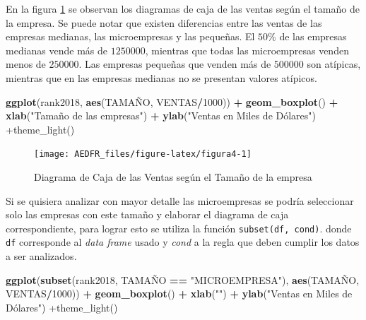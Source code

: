 \documentclass[letterpaper,]{book}
\newenvironment{Shaded}{\begin{snugshade}}{\end{snugshade}}
\newcommand{\DecValTok}[1]{\textcolor[rgb]{0.00,0.00,0.81}{#1}}
\newcommand{\KeywordTok}[1]{\textcolor[rgb]{0.13,0.29,0.53}{\textbf{#1}}}
\newcommand{\NormalTok}[1]{#1}
\newcommand{\OperatorTok}[1]{\textcolor[rgb]{0.81,0.36,0.00}{\textbf{#1}}}
\newcommand{\StringTok}[1]{\textcolor[rgb]{0.31,0.60,0.02}{#1}}
\begin{document}
En la figura \ref{fig:figura4} se observan los diagramas de caja de las ventas según el tamaño de la empresa. Se puede notar que existen diferencias entre las ventas de las empresas medianas, las microempresas y las pequeñas. El \(50\%\) de las empresas medianas vende más de \(1250000\), mientras que todas las microempresas venden menos de \(250000\). Las empresas pequeñas que venden más de \(500000\) son atípicas, mientras que en las empresas medianas no se presentan valores atípicos.

\begin{Shaded}
\begin{Highlighting}[]
\KeywordTok{ggplot}\NormalTok{(rank2018, }\KeywordTok{aes}\NormalTok{(TAMAÑO, VENTAS}\OperatorTok{/}\DecValTok{1000}\NormalTok{)) }\OperatorTok{+}\StringTok{ }
\StringTok{  }\KeywordTok{geom_boxplot}\NormalTok{() }\OperatorTok{+}\StringTok{ }\KeywordTok{xlab}\NormalTok{(}\StringTok{"Tamaño de las empresas"}\NormalTok{) }\OperatorTok{+}
\StringTok{  }\KeywordTok{ylab}\NormalTok{(}\StringTok{"Ventas en Miles de Dólares") +theme_light()}
\end{Highlighting}
\end{Shaded}

\begin{figure}[h!]

{\centering \texttt{[image: AEDFR\_files/figure-latex/figura4-1]} 

}

\caption{Diagrama de Caja de las Ventas según el Tamaño de la empresa}\label{fig:figura4}
\end{figure}

Si se quisiera analizar con mayor detalle las microempresas se podría seleccionar solo las empresas con este tamaño y elaborar el diagrama de caja correspondiente, para lograr esto se utiliza la función \texttt{subset(df,\ cond)}. donde \texttt{df} corresponde al \emph{data frame} usado y \emph{cond} a la regla que deben cumplir los datos a ser analizados.

\begin{Shaded}
\begin{Highlighting}[]
\KeywordTok{ggplot}\NormalTok{(}\KeywordTok{subset}\NormalTok{(rank2018, TAMAÑO }\OperatorTok{==}\StringTok{ "MICROEMPRESA"}\NormalTok{), }\KeywordTok{aes}\NormalTok{(TAMAÑO, VENTAS}\OperatorTok{/}\DecValTok{1000}\NormalTok{)) }\OperatorTok{+}\StringTok{ }
\StringTok{  }\KeywordTok{geom_boxplot}\NormalTok{() }\OperatorTok{+}\StringTok{ }\KeywordTok{xlab}\NormalTok{(}\StringTok{""}\NormalTok{) }\OperatorTok{+}
\StringTok{  }\KeywordTok{ylab}\NormalTok{(}\StringTok{"Ventas en Miles de Dólares") +theme_light()}
\end{Highlighting}
\end{Shaded}
\end{document}
